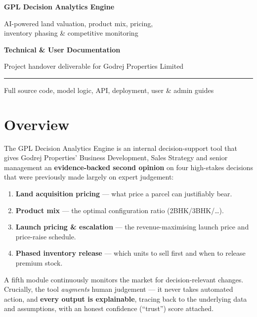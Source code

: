\documentclass[11pt,a4paper]{article}
\begin{document}
\begin{titlepage}
\centering
\vspace*{2.5cm}
{\color{navy}\Huge\bfseries GPL Decision Analytics Engine\par}
\vspace{0.6cm}
{\Large AI-powered land valuation, product mix, pricing,\\ inventory phasing \& competitive monitoring\par}
\vspace{2cm}
{\large\textbf{Technical \& User Documentation}\par}
\vspace{0.3cm}
{\large Project handover deliverable for Godrej Properties Limited\par}
\vfill
{\color{navy}\rule{0.6\textwidth}{1pt}}\par
\vspace{0.4cm}
{\large Full source code, model logic, API, deployment, user \& admin guides\par}
\vspace{2cm}
\end{titlepage}

\tableofcontents
\newpage

\section{Overview}
The GPL Decision Analytics Engine is an internal decision-support tool that gives
Godrej Properties' Business Development, Sales Strategy and senior management an
\textbf{evidence-backed second opinion} on four high-stakes decisions that were
previously made largely on expert judgement:

\begin{enumerate}[noitemsep]
  \item \textbf{Land acquisition pricing} --- what price a parcel can justifiably bear.
  \item \textbf{Product mix} --- the optimal configuration ratio (2BHK/3BHK/\dots).
  \item \textbf{Launch pricing \& escalation} --- the revenue-maximising launch price and price-raise schedule.
  \item \textbf{Phased inventory release} --- which units to sell first and when to release premium stock.
\end{enumerate}

A fifth module continuously monitors the market for decision-relevant changes.
Crucially, the tool \emph{augments} human judgement --- it never takes automated
action, and \textbf{every output is explainable}, tracing back to the underlying
data and assumptions, with an honest confidence (``trust'') score attached.
\end{document}
